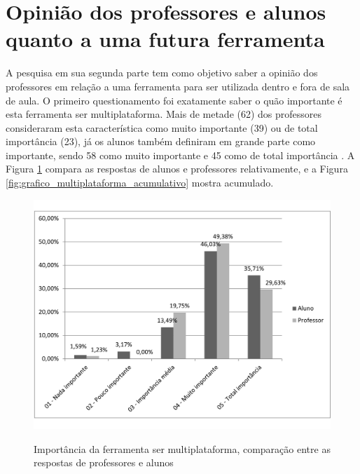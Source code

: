 \section{Opinião dos professores e alunos quanto a uma futura ferramenta}

A pesquisa em sua segunda parte tem como objetivo saber a opinião dos professores em relação a uma ferramenta para ser utilizada dentro e fora de sala de aula. O primeiro questionamento foi exatamente saber o quão importante é esta ferramenta ser multiplataforma. Mais de metade (62) dos professores consideraram esta característica como muito importante (39) ou de total importância (23), já os alunos também definiram em grande parte como importante, sendo 58 como muito importante e 45 como de total importância . A Figura \ref{fig:grafico_multiplataforma} compara as respostas de alunos e professores relativamente, e a Figura \ref{fig:grafico_multiplataforma_acumulativo} mostra acumulado. 

\begin{figure}[!h]
\centering
\caption{Importância da ferramenta ser multiplataforma, comparação entre as respostas de professores e alunos}
\includegraphics[width=1.0\textwidth]{pesquisa/multiplataforma-relativo.pdf} 
\label{fig:grafico_multiplataforma} 
\end{figure}

